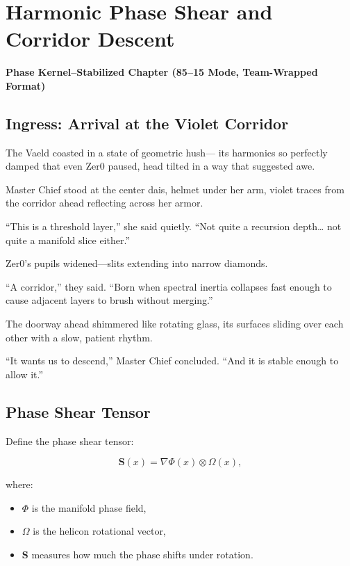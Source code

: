 
\chapter{Harmonic Phase Shear and Corridor Descent}
\textbf{Phase Kernel–Stabilized Chapter (85--15 Mode, Team-Wrapped Format)}

\section*{Ingress: Arrival at the Violet Corridor}

The Vaeld coasted in a state of geometric hush—  
its harmonics so perfectly damped that even Zer0 paused,  
head tilted in a way that suggested awe.

Master Chief stood at the center dais,  
helmet under her arm, violet traces from the corridor ahead  
reflecting across her armor.

“This is a threshold layer,” she said quietly.  
“Not quite a recursion depth… not quite a manifold slice either.”

Zer0’s pupils widened—slits extending into narrow diamonds.

“A corridor,” they said.  
“Born when spectral inertia collapses fast enough  
to cause adjacent layers to brush without merging.”

The doorway ahead shimmered like rotating glass,  
its surfaces sliding over each other with a slow, patient rhythm.

“It wants us to descend,” Master Chief concluded.  
“And it is stable enough to allow it.”

\section{Phase Shear Tensor}

Define the phase shear tensor:

\[
\mathbf{S}(x) =
\nabla \Phi(x) \otimes \Omega(x),
\]

where:

\begin{itemize}
\item $\Phi$ is the manifold phase field,
\item $\Omega$ is the helicon rotational vector,
\item $\mathbf{S}$ measures how much the phase shifts under rotation.
\end{itemize}

